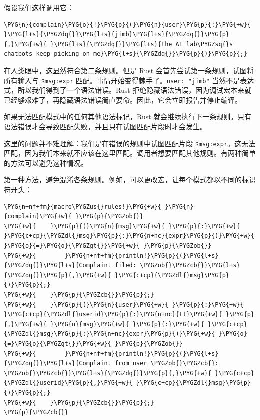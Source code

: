假设我们这样调用它：

\begin{Verbatim}[commandchars=\\\{\},breaklines=true,breakanywhere=true,fontsize=\codefont,xleftmargin=17bp]
\PYG{n}{complain}\PYG{o}{!}\PYG{p}{(}\PYG{n}{user}\PYG{p}{:}\PYG{+w}{ }\PYG{l+s}{\PYGZdq{}}\PYG{l+s}{jimb}\PYG{l+s}{\PYGZdq{}}\PYG{p}{,}\PYG{+w}{ }\PYG{l+s}{\PYGZdq{}}\PYG{l+s}{the AI lab\PYGZsq{}s chatbots keep picking on me}\PYG{l+s}{\PYGZdq{}}\PYG{p}{)}\PYG{p}{;}
\end{Verbatim}

在人类眼中，这显然符合第二条规则。但是 Rust 会首先尝试第一条规则，试图将所有输入与 \texttt{\$msg:expr} 匹配。事情开始变得棘手了。\texttt{user: "jimb"} 当然不是表达式，所以我们得到了一个语法错误。Rust 拒绝隐藏语法错误，因为调试宏本来就已经够艰难了，再隐藏语法错误简直要命。因此，它会立即报告并停止编译。

如果无法匹配模式中的任何其他语法标记，Rust 就会继续执行下一条规则。只有语法错误才会导致匹配失败，并且只在试图匹配片段时才会发生。

这里的问题并不难理解：我们是在错误的规则中试图匹配片段 \texttt{\$msg:expr}。这无法匹配，因为我们本来就不应该在这里匹配。调用者想要匹配其他规则。有两种简单的方法可以避免这种情况。

第一种方法，避免混淆各条规则。例如，可以更改宏，让每个模式都以不同的标识符开头：

\begin{Verbatim}[commandchars=\\\{\},breaklines=true,breakanywhere=true,fontsize=\codefont,xleftmargin=17bp]
\PYG{n+nf+fm}{macro\PYGZus{}rules!}\PYG{+w}{ }\PYG{n}{complain}\PYG{+w}{ }\PYG{p}{\PYGZob{}}
\PYG{+w}{    }\PYG{p}{(}\PYG{n}{msg}\PYG{+w}{ }\PYG{p}{:}\PYG{+w}{ }\PYG{c+cp}{\PYGZdl{}msg}\PYG{p}{:}\PYG{n+nc}{expr}\PYG{p}{)}\PYG{+w}{ }\PYG{o}{=}\PYG{o}{\PYGZgt{}}\PYG{+w}{ }\PYG{p}{\PYGZob{}}
\PYG{+w}{        }\PYG{n+nf+fm}{println!}\PYG{p}{(}\PYG{l+s}{\PYGZdq{}}\PYG{l+s}{Complaint filed: \PYGZob{}\PYGZcb{}}\PYG{l+s}{\PYGZdq{}}\PYG{p}{,}\PYG{+w}{ }\PYG{c+cp}{\PYGZdl{}msg}\PYG{p}{)}\PYG{p}{;}
\PYG{+w}{    }\PYG{p}{\PYGZcb{}}\PYG{p}{;}
\PYG{+w}{    }\PYG{p}{(}\PYG{n}{user}\PYG{+w}{ }\PYG{p}{:}\PYG{+w}{ }\PYG{c+cp}{\PYGZdl{}userid}\PYG{p}{:}\PYG{n+nc}{tt}\PYG{+w}{ }\PYG{p}{,}\PYG{+w}{ }\PYG{n}{msg}\PYG{+w}{ }\PYG{p}{:}\PYG{+w}{ }\PYG{c+cp}{\PYGZdl{}msg}\PYG{p}{:}\PYG{n+nc}{expr}\PYG{p}{)}\PYG{+w}{ }\PYG{o}{=}\PYG{o}{\PYGZgt{}}\PYG{+w}{ }\PYG{p}{\PYGZob{}}
\PYG{+w}{        }\PYG{n+nf+fm}{println!}\PYG{p}{(}\PYG{l+s}{\PYGZdq{}}\PYG{l+s}{Complaint from user \PYGZob{}\PYGZcb{}: \PYGZob{}\PYGZcb{}}\PYG{l+s}{\PYGZdq{}}\PYG{p}{,}\PYG{+w}{ }\PYG{c+cp}{\PYGZdl{}userid}\PYG{p}{,}\PYG{+w}{ }\PYG{c+cp}{\PYGZdl{}msg}\PYG{p}{)}\PYG{p}{;}
\PYG{+w}{    }\PYG{p}{\PYGZcb{}}\PYG{p}{;}
\PYG{p}{\PYGZcb{}}
\end{Verbatim}

